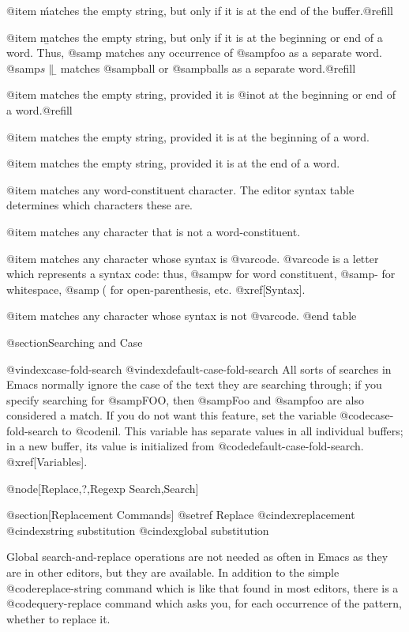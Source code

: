 {{{{{{{{{{{{{{{{@item \'
matches the empty string, but only if it is at the end of
the buffer.@refill

@item \b
matches the empty string, but only if it is at the beginning or
end of a word.  Thus, @samp{\bfoo\b} matches any occurrence of
@samp{foo} as a separate word.  @samp{\bball\(s\|\)\b} matches
@samp{ball} or @samp{balls} as a separate word.@refill

@item \B
matches the empty string, provided it is @i{not} at the beginning or
end of a word.@refill

@item \<
matches the empty string, provided it is at the beginning of a word.

@item \>
matches the empty string, provided it is at the end of a word.

@item \w
matches any word-constituent character.
The editor syntax table determines which characters these are.

@item \W
matches any character that is not a word-constituent.

@item 
matches any character whose syntax is @var{code}.
@var{code} is a letter which represents a syntax code:
thus, @samp{w} for word constituent, @samp{-} for
whitespace, @samp{(} for open-parenthesis, etc.
@xref[Syntax].

@item 
matches any character whose syntax is not @var{code}.
@end table

@section{Searching and Case}

@vindex{case-fold-search}
@vindex{default-case-fold-search}
  All sorts of searches in Emacs normally ignore the case of the text they
are searching through; if you specify searching for @samp{FOO}, then
@samp{Foo} and @samp{foo} are also considered a match.  If you do not want
this feature, set the variable @code{case-fold-search} to @code{nil}.
This variable has separate values in all individual buffers; in a new
buffer, its value is initialized from @code{default-case-fold-search}.
@xref[Variables].

@node[Replace,?,Regexp Search,Search]

@section[Replacement Commands]
@setref Replace
@cindex{replacement}
@cindex{string substitution}
@cindex{global substitution}

  Global search-and-replace operations are not needed as often in Emacs as
they are in other editors, but they are available.  In addition to the
simple @code{replace-string} command which is like that found in most
editors, there is a @code{query-replace} command which asks you, for each
occurrence of the pattern, whether to replace it.

}}}}}}}}}}}}}}}}
